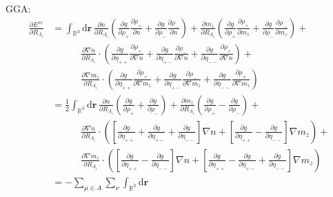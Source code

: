 \documentclass[11pt]{article}
\newcommand{\dd}[1]{\mathrm{d}{#1}\,}
\begin{document}
GGA:
\begin{align}
\frac{\partial E^{xc}}{\partial R_{A_i}} &= \int_{\mathbb{R}^3} \dd{\mathbf{r}} 
  \frac{\partial n}{\partial R_{A_i}}\left( \frac{\partial g}{\partial \rho_+}\frac{\partial\rho_+}{\partial n} +
    \frac{\partial g}{\partial \rho_-}\frac{\partial\rho_-}{\partial n} \right) +
  \frac{\partial m_z}{\partial R_{A_i}}\left( \frac{\partial g}{\partial \rho_+}\frac{\partial\rho_+}{\partial m_z} +
    \frac{\partial g}{\partial \rho_-}\frac{\partial\rho_-}{\partial m_z} \right) + 
  \nonumber \\ &\qquad\quad
  \frac{\partial \nabla n}{\partial R_{A_i}} \cdot \left( 
    \frac{\partial g}{\partial \eta_{++}}\frac{\partial\rho_+}{\partial \nabla n} +
    \frac{\partial g}{\partial \eta_{+-}}\frac{\partial\rho_-}{\partial \nabla n} +
    \frac{\partial g}{\partial \eta_{--}}\frac{\partial\rho_+}{\partial \nabla n} 
  \right) +
  \nonumber \\ &\qquad\quad
  \frac{\partial \nabla m_z}{\partial R_{A_i}} \cdot \left( 
    \frac{\partial g}{\partial \eta_{++}}\frac{\partial\rho_+}{\partial \nabla m_z} +
    \frac{\partial g}{\partial \eta_{+-}}\frac{\partial\rho_-}{\partial \nabla m_z} +
    \frac{\partial g}{\partial \eta_{--}}\frac{\partial\rho_+}{\partial \nabla m_z} 
  \right) 
  \nonumber \\
&= \frac{1}{2}\int_{\mathbb{R}^3} \dd{\mathbf{r}} 
  \frac{\partial n}  {\partial R_{A_i}}\left( \frac{\partial g}{\partial \rho_+} + \frac{\partial g}{\partial \rho_-} \right) +
  \frac{\partial m_z}{\partial R_{A_i}}\left( \frac{\partial g}{\partial \rho_+} - \frac{\partial g}{\partial \rho_-} \right) +
  \nonumber \\ &\qquad\quad
  \frac{\partial \nabla n}{\partial R_{A_i}} \cdot \left( 
      \left[ \frac{\partial g}{\partial \eta_{++}} + \frac{\partial g}{\partial \eta_{+-}} + \frac{\partial g}{\partial \eta_{--}} \right] \nabla n +
      \left[ \frac{\partial g}{\partial \eta_{++}} - \frac{\partial g}{\partial \eta_{--}} \right] \nabla m_z
  \right) +
  \nonumber \\ &\qquad\quad
  \frac{\partial \nabla m_z}{\partial R_{A_i}} \cdot \left( 
      \left[ \frac{\partial g}{\partial \eta_{++}} - \frac{\partial g}{\partial \eta_{--}} \right] \nabla n +
      \left[ \frac{\partial g}{\partial \eta_{++}} - \frac{\partial g}{\partial \eta_{+-}} + \frac{\partial g}{\partial \eta_{--}} \right] \nabla m_z
  \right) \nonumber\\ 
&= -\sum_{\mu\in A} \sum_\nu \int_{\mathbb{R}^3} \dd{\mathbf{r}} 

\end{align}
\end{document}
